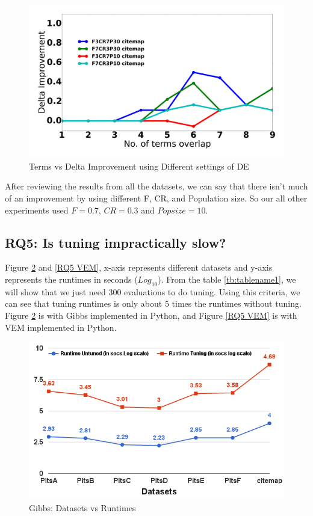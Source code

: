 \documentclass[conference]{IEEEtran}
\theoremstyle{break}
\begin{document}
\begin{figure}[!htb]
  \includegraphics[width=\linewidth]{./fig/citemap.png}
  \caption{Terms vs Delta Improvement using Different settings of DE}
  \label{fig:RQ4}
\end{figure}

After reviewing the results from all the datasets, we can say that there isn't much of an improvement by using different F, CR, and Population size. So our all other experiments used $F=0.7$, $CR=0.3$ and $Pop size = 10$.

\subsection{\textbf{RQ5: Is tuning impractically slow?}}

Figure \ref{RQ5 Gibbs} and \ref{RQ5 VEM}, x-axis represents different datasets and y-axis represents the runtimes in seconds ($Log_{10}$). From the table \ref{tb:tablename1}, we will show that we just need 300 evaluations to do tuning. Using this criteria, we can see that tuning runtimes is only about 5 times the runtimes without tuning. Figure \ref{RQ5 Gibbs} is with Gibbs implemented in Python, and Figure \ref{RQ5 VEM} is with VEM implemented in Python.

\begin{center}
\begin{figure}[!h]
  \includegraphics[width=\linewidth]{./fig/Run_gibbs_sci.png}
  \caption{Gibbs: Datasets vs Runtimes}
  \label{RQ5 Gibbs}
\end{figure}
\end{center}
\end{document}
